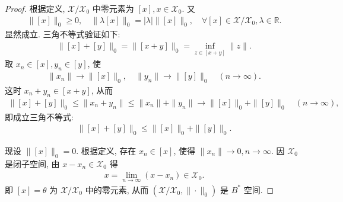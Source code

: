 \documentclass[../../main.tex]{subfiles}%
\begin{document}
\begin{proof}
根据定义, $\mathscr{X}/\mathscr{X}_0$ 中零元素为 $[x],x \in \mathscr{X}_0$. 又
\begin{align*}
\|[x]\|_0 \geqslant 0, \quad \|\lambda [x]\|_0 = |\lambda| \| [x]\|_0, \quad \forall [x] \in \mathscr{X}/\mathscr{X}_0, \lambda \in \mathbb{R}.
\end{align*}
显然成立. 三角不等式验证如下:
\begin{align*}
\|[x] + [y]\|_0 = \|[x+y]\|_0 = \inf_{z \in [x+y]} \|z\|.
\end{align*}
取 $x_n \in [x], y_n \in [y]$, 使
\begin{align*}
\|x_n\| \to \|[x]\|_0, \quad \|y_n\| \to \|[y]\|_0 \quad (n \to \infty).
\end{align*}
这时 $x_n + y_n \in [x+y]$, 从而
\begin{align*}
\|[x] + [y]\|_0 \leqslant \|x_n + y_n\| 
\leqslant \|x_n\| + \|y_n\| \to \|[x]\|_0 + \|[y]\|_0 \quad (n \to \infty),
\end{align*}
即成立三角不等式:
\begin{align*}
\|[x] + [y]\|_0 \leqslant \|[x]\|_0 + \|[y]\|_0.
\end{align*}

现设 $\|[x]\|_0 = 0$. 根据定义, 存在 $x_n \in [x]$, 使得 $\|x_n\| \to 0, n \to \infty$. 因 $\mathscr{X}_0$ 是闭子空间, 由 $x - x_n \in \mathscr{X}_0$ 得
\begin{align*}
x = \lim\limits_{n \to \infty} (x - x_n) \in \mathscr{X}_0.
\end{align*}
即 $[x] = \theta$ 为 $\mathscr{X}/\mathscr{X}_0$ 中的零元素, 从而 $(\mathscr{X}/\mathscr{X}_0,\|\cdot\|_0)$ 是 $B^*$ 空间.


\end{proof}
\end{document}
